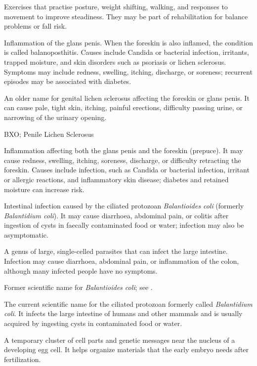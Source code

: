  Exercises that practise posture, weight shifting, walking, and responses to movement to improve steadiness. They may be part of rehabilitation for balance problems or fall risk.

 Inflammation of the glans penis. When the foreskin is also inflamed,
the condition is called balanoposthitis. Causes include Candida or bacterial infection,
irritants, trapped moisture, and skin disorders such as psoriasis or lichen sclerosus.
Symptoms may include redness, swelling, itching, discharge, or soreness; recurrent episodes
may be associated with diabetes.

 An older name for genital lichen sclerosus affecting the foreskin or glans penis. It can cause pale, tight skin, itching, painful erections, difficulty passing urine, or narrowing of the urinary opening.

\synonyms
BXO; Penile Lichen Sclerosus

 Inflammation affecting both the glans penis and the foreskin (prepuce). It may
cause redness, swelling, itching, soreness, discharge, or difficulty retracting the foreskin.
Causes include infection, such as Candida or bacterial infection, irritant or allergic
reactions, and inflammatory skin disease; diabetes and retained moisture can increase risk.

 Intestinal infection caused by the ciliated protozoan \textit{Balantioides coli} (formerly \textit{Balantidium coli}). It may cause diarrhoea, abdominal pain, or colitis after ingestion of cysts in faecally contaminated food or water; infection may also be asymptomatic.

 A genus of large, single-celled parasites that can infect the large intestine. Infection may cause diarrhoea, abdominal pain, or inflammation of the colon, although many infected people have no symptoms.

 Former scientific name for \textit{Balantioides coli}; see .

 The current scientific name for the ciliated protozoan formerly called \textit{Balantidium coli}. It infects the large intestine of humans and other mammals and is usually acquired by ingesting cysts in contaminated food or water.

 A temporary cluster of cell parts and genetic messages near the nucleus of a developing egg cell. It helps organize materials that the early embryo needs after fertilization.

